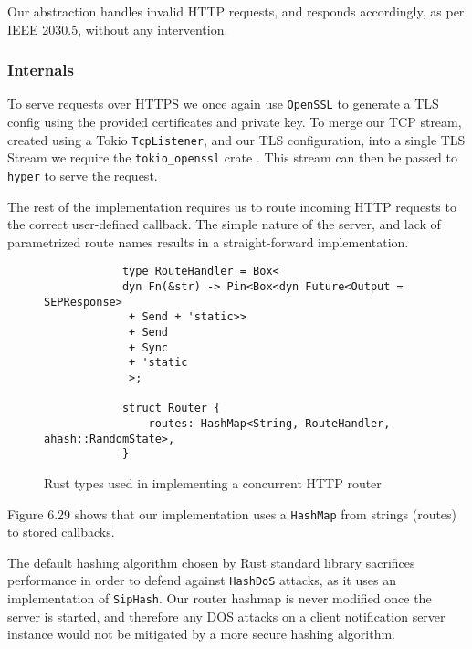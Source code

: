 Our abstraction handles invalid HTTP requests, and responds accordingly, as per IEEE 2030.5, without any intervention.

\subsubsection{Internals}
To serve requests over HTTPS we once again use \texttt{OpenSSL} to generate a TLS config using the provided certificates and private key. To merge our TCP stream, created using a Tokio \texttt{TcpListener}, and our TLS configuration, into a single TLS Stream we require the \texttt{tokio\_openssl} crate \cite{tokioopenssl}. This stream can then be passed to \texttt{hyper} to serve the request.

The rest of the implementation requires us to route incoming HTTP requests to the correct user-defined callback. The simple nature of the server, and lack of parametrized route names results in a straight-forward implementation.

\begin{figure}[h]
    \begin{center}
        \begin{lstlisting}
            type RouteHandler = Box<
            dyn Fn(&str) -> Pin<Box<dyn Future<Output = SEPResponse>
             + Send + 'static>>
             + Send
             + Sync
             + 'static
             >;

            struct Router {
                routes: HashMap<String, RouteHandler, ahash::RandomState>,
            }

        \end{lstlisting}
        \label{fig:routerimpl}
        \vspace{-10pt}
        \caption{Rust types used in implementing a concurrent HTTP router}
    \end{center}
\end{figure}

Figure 6.29 shows that our implementation uses a \texttt{HashMap} from strings (routes) to stored callbacks. 

The default hashing algorithm chosen by Rust standard library sacrifices performance in order to defend against \texttt{HashDoS} attacks, as it uses an implementation of \texttt{SipHash}. Our router hashmap is never modified once the server is started, and therefore any DOS attacks on a client notification server instance would not be mitigated by a more secure hashing algorithm.

